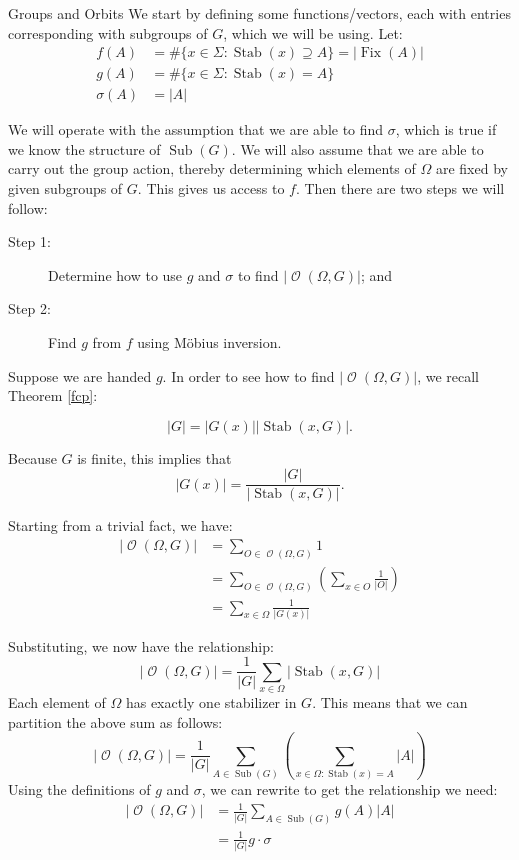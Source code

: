 \documentclass[12pt]{pom_thesis}
\DeclareMathOperator{\fix}{Fix}
\DeclareMathOperator{\sub}{Sub}
\DeclareMathOperator{\stab}{Stab}
\DeclareMathOperator{\orb}{\mathcal{O}}
\begin{document}
\begin{chapter}{Groups and Orbits}
We start by defining some functions/vectors, each with entries corresponding with subgroups of $G$, which we will be using. Let:
\begin{align*}
f(A) &= \#\{x \in \Sigma: \stab(x) \supseteq A\} = |\fix(A)|\\
g(A) &= \#\{x \in \Sigma: \stab(x) = A\}\\
\sigma(A) &= |A|
\end{align*}

We will operate with the assumption that we are able to find $\sigma$, which is true if we know the structure of $\sub(G)$. We will also assume that we are able to carry out the group action, thereby determining which elements of $\Omega$ are fixed by given subgroups of $G$. This gives us access to $f$. Then there are two steps we will follow:
\begin{description}
\item[Step 1:] Determine how to use $g$ and $\sigma$ to find $|\orb(\Omega, G)|$; and
\item[Step 2:] Find $g$ from $f$ using M\"obius inversion.
\end{description}

Suppose we are handed $g$. In order to see how to find $|\orb(\Omega, G)|$, we recall Theorem \ref{fcp}:

\[|G| = |G(x)||\stab(x, G)|.\]

Because $G$ is finite, this implies that \[|G(x)| = \frac{|G|}{|\stab(x, G)|}.\]

Starting from a trivial fact, we have:
\begin{align*}
|\orb(\Omega, G)| &= \sum_{O \in \orb(\Omega, G)}1\\
&= \sum_{O \in \orb(\Omega, G)}\left(\sum_{x \in O}\frac{1}{|O|}\right)\\
&= \sum_{x \in \Omega}\frac{1}{|G(x)|}
\end{align*}

Substituting, we now have the relationship:
\[
|\orb(\Omega, G)| = \frac{1}{|G|}\sum_{x \in \Omega}|\stab(x, G)|
\]
Each element of $\Omega$ has exactly one stabilizer in $G$. This means that we can partition the above sum as follows:
\[
|\orb(\Omega, G)| = \frac{1}{|G|}\sum_{A \in \sub(G)}\left(\sum_{x \in \Omega: \stab(x) = A}|A|\right)
\]
Using the definitions of $g$ and $\sigma$, we can rewrite to get the relationship we need:
\begin{align*}
|\orb(\Omega, G)| &= \frac{1}{|G|}\sum_{A \in \sub(G)}g(A)|A|\\
&= \frac {1}{|G|}g \cdot \sigma
\end{align*}


\end{chapter}
\end{document}
